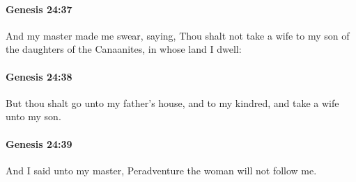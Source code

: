 		\paragraph{Genesis 24:37} %
			\label{GENESIS-24-37}

			And my master made me swear, saying, Thou shalt not take a wife to my son of the daughters of the Canaanites, in whose land I dwell:


		\paragraph{Genesis 24:38} %
			\label{GENESIS-24-38}

			But thou shalt go unto my father's house, and to my kindred, and take a wife unto my son.


		\paragraph{Genesis 24:39} %
			\label{GENESIS-24-39}

			And I said unto my master, Peradventure the woman will not follow me.



